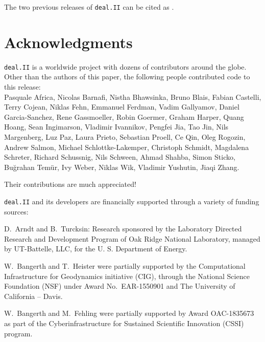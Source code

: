 \documentclass{ansarticle-preprint}
\newcommand{\specialword}[1]{\texttt{#1}}
\newcommand{\dealii}{{\specialword{deal.II}}\xspace}
\begin{document}
The two previous releases of \dealii can be cited as
\cite{dealII92,dealII93}.


\section{Acknowledgments}

\dealii is a worldwide project with dozens of contributors around the
globe. Other than the authors of this paper, the following people
contributed code to this release:\\
%
%


Pasquale    Africa,
Nicolas     Barnafi,
Nistha      Bhawsinka,
Bruno       Blais,
Fabian      Castelli,
Terry       Cojean,
Niklas      Fehn,
Emmanuel    Ferdman,
Vadim       Gallyamov,
Daniel      Garcia-Sanchez,
Rene        Gassmoeller,
Robin       Goermer,
Graham      Harper,
Quang       Hoang,
Sean        Ingimarson,
Vladimir    Ivannikov,
Pengfei     Jia,
Tao         Jin,
Nils        Margenberg,
Luz         Paz,
Laura       Prieto,
Sebastian   Proell,
Ce          Qin,
Oleg        Rogozin,
Andrew      Salmon,
Michael     Schlottke-Lakemper,
Christoph   Schmidt,
Magdalena   Schreter,
Richard     Schussnig,
Nils        Schween,
Ahmad       Shahba,
Simon       Sticko,
Buğrahan    Temür,
Ivy         Weber,
Niklas      Wik,
Vladimir    Yushutin,
Jiaqi       Zhang.

Their contributions are much appreciated!


\bigskip

\dealii and its developers are financially supported through a
variety of funding sources:

D.~Arndt and B.~Turcksin: Research sponsored by the Laboratory Directed Research and
Development Program of Oak Ridge National Laboratory, managed by UT-Battelle,
LLC, for the U. S. Department of Energy.

W.~Bangerth and T.~Heister were partially
supported by the Computational Infrastructure for Geodynamics initiative
(CIG), through the National Science Foundation (NSF) under Award
No.~EAR-1550901 and The University of California -- Davis.

W.~Bangerth and M.~Fehling were partially supported by Award OAC-1835673
as part of the Cyberinfrastructure for Sustained Scientific Innovation (CSSI)
program.
\end{document}

